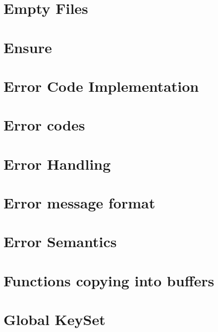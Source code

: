 \let\mypdfximage\pdfximage\def\pdfximage{\immediate\mypdfximage}\documentclass[twoside]{book}
\newcommand{\+}{\discretionary{\mbox{\scriptsize$\hookleftarrow$}}{}{}}
\begin{document}
\chapter{Empty Files}
\label{doc_decisions_empty_files_md}

\chapter{Ensure}
\label{doc_decisions_ensure_md}

\chapter{Error Code Implementation}
\label{doc_decisions_error_code_implementation_md}

\chapter{Error codes}
\label{doc_decisions_error_codes_md}

\chapter{Error Handling}
\label{doc_decisions_error_handling_md}

\chapter{Error message format}
\label{doc_decisions_error_message_format_md}

\chapter{Error Semantics}
\label{doc_decisions_error_semantics_md}

\chapter{Functions copying into buffers}
\label{doc_decisions_functions_with_buffers_md}

\chapter{Global Key\+Set}
\label{doc_decisions_global_keyset_md}

\end{document}
